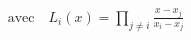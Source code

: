 \documentclass[preview]{standalone}
\begin{document}
\begin{align*}
\quad \text{avec} \quad L_i(x) = \prod_{j \neq i} \frac{x - x_j}{x_i - x_j}
\end{align*}
\end{document}
